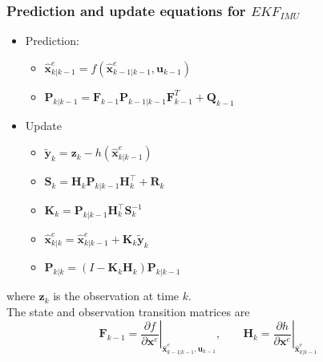 \documentclass[conference]{IEEEtran}
\begin{document}
\subsubsection{Prediction and update equations for $EKF_{IMU}$}
\begin{itemize}
	\item Prediction:
	\begin{itemize}
		\item $\hat{\mathbf{x}}_{k|k-1}^e = f(\hat{\mathbf{x}}_{k-1|k-1}^e, \mathbf{u}_{k-1})$
		\item $ \mathbf{P}_{k|k-1} =  {{\mathbf{F}_{k-1}}} \mathbf{P}_{k-1|k-1}{  {\mathbf{F}_{k-1}^T}} + \mathbf{Q}_{k-1} $
	\end{itemize}
	\item Update
	\begin{itemize}
		\item $\tilde{\mathbf{y}}_{k} = \mathbf{z}_{k} - h(\hat{\mathbf{x}}_{k|k-1}^e)$
		\item $\mathbf{S}_{k} = { \mathbf{H}_{k}}\mathbf{P}_{k|k-1}{ \mathbf{H}_{k}^\top} + \mathbf{R}_{k}$
		\item $\mathbf{K}_{k} = \mathbf{P}_{k|k-1}{ \mathbf{H}_{k}^\top}\mathbf{S}_{k}^{-1} $
		\item $\hat{\mathbf{x}}_{k|k}^e = \hat{\mathbf{x}}_{k|k-1}^e + \mathbf{K}_{k}\tilde{\mathbf{y}}_{k} $
		\item $ \mathbf{P}_{k|k} = (I - \mathbf{K}_{k} { \mathbf{H}_{k}}) \mathbf{P}_{k|k-1} $
	\end{itemize}
\end{itemize}
where $\mathbf{z}_{k}$ is the observation at time $k$.\\
The state and observation transition matrices are 
$$ 
{ \mathbf{F}_{k-1}} = \left . \frac{\partial f}{\partial \mathbf{x}^e } \right \vert _{\hat{\mathbf{x}}_{k-1|k-1}^e,\mathbf{u}_{k-1}} , \;\;\;\;\;\;\;
{ \mathbf{H}_{k}} = \left . \frac{\partial h}{\partial \mathbf{x}^e } \right \vert _{\hat{\mathbf{x}}_{k|k-1}^e} 
$$
\end{document}
